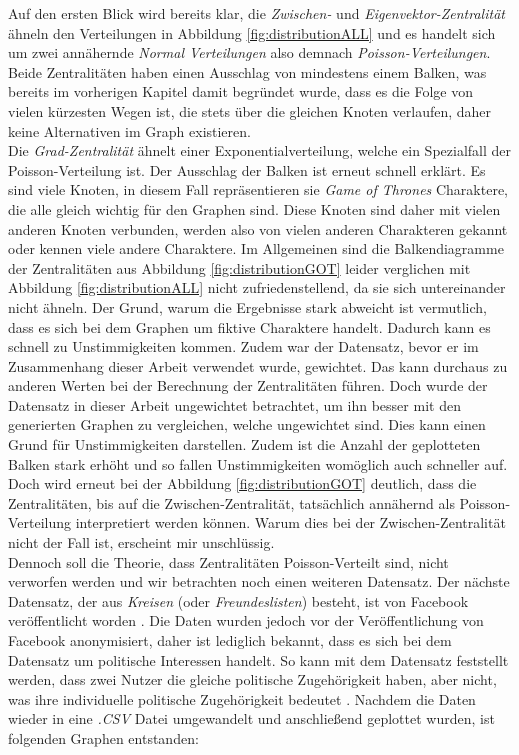  Auf den ersten Blick wird bereits klar, die \textit{Zwischen-} und \textit{Eigenvektor-Zentralität} ähneln den Verteilungen in Abbildung \ref{fig:distributionALL} und es handelt sich um zwei annähernde \textit{Normal Verteilungen} also demnach \textit{Poisson-Verteilungen}. Beide Zentralitäten haben einen Ausschlag von mindestens einem Balken, was bereits im vorherigen Kapitel damit begründet wurde, dass es die Folge von vielen kürzesten Wegen ist, die stets über die gleichen
Knoten verlaufen, daher keine Alternativen im Graph existieren. \\

Die \textit{Grad-Zentralität} ähnelt einer Exponentialverteilung, welche ein Spezialfall der Poisson-Verteilung ist. Der Ausschlag der Balken ist erneut schnell erklärt. Es sind viele Knoten, in diesem Fall repräsentieren sie \textit{Game of Thrones} Charaktere, die alle gleich wichtig für den Graphen sind. Diese Knoten sind daher mit vielen anderen Knoten verbunden, werden also von vielen anderen Charakteren gekannt oder kennen viele andere Charaktere. Im Allgemeinen sind die Balkendiagramme der Zentralitäten aus Abbildung \ref{fig:distributionGOT} leider verglichen mit Abbildung \ref{fig:distributionALL} nicht zufriedenstellend, da sie sich untereinander nicht ähneln. Der Grund, warum die Ergebnisse stark abweicht ist vermutlich, dass es sich bei dem Graphen um fiktive Charaktere handelt. Dadurch kann es schnell zu Unstimmigkeiten kommen. Zudem war der Datensatz, bevor er im Zusammenhang dieser Arbeit verwendet wurde, gewichtet. Das kann durchaus zu anderen Werten bei der Berechnung der Zentralitäten führen. Doch wurde der Datensatz in dieser Arbeit ungewichtet betrachtet, um ihn besser mit den generierten Graphen zu vergleichen, welche ungewichtet sind. Dies kann einen Grund für Unstimmigkeiten darstellen. Zudem ist die Anzahl der geplotteten Balken stark erhöht und so fallen Unstimmigkeiten womöglich auch schneller auf. Doch wird erneut bei der Abbildung \ref{fig:distributionGOT} deutlich, dass die Zentralitäten, bis auf die Zwischen-Zentralität, tatsächlich annähernd als Poisson-Verteilung interpretiert werden können. Warum dies bei der Zwischen-Zentralität nicht der Fall ist, erscheint mir unschlüssig. \\ 

Dennoch soll die Theorie, dass Zentralitäten Poisson-Verteilt sind, nicht verworfen werden und wir betrachten noch einen weiteren Datensatz. Der nächste Datensatz, der aus \textit{Kreisen} (oder \textit{Freundeslisten}) besteht, ist von Facebook veröffentlicht worden \cite{FBData}. Die Daten wurden jedoch vor der Veröffentlichung von Facebook anonymisiert, daher ist lediglich bekannt, dass es sich bei dem Datensatz um politische Interessen handelt. So kann mit dem Datensatz feststellt werden, dass zwei Nutzer die gleiche politische Zugehörigkeit haben, aber nicht, was ihre individuelle politische Zugehörigkeit bedeutet \cite{FBData}.
Nachdem die Daten wieder in eine \textit{.CSV} Datei umgewandelt und anschließend geplottet wurden, ist folgenden Graphen entstanden: 


